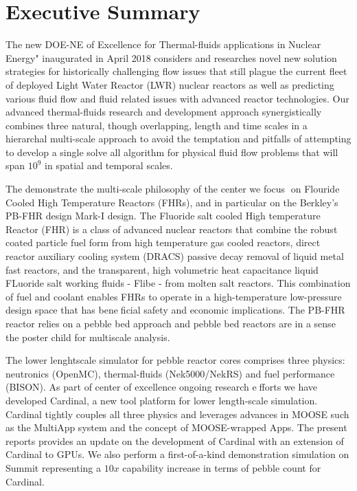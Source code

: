 
\section*{Executive Summary}

The new DOE-NE \Center of Excellence for Thermal-fluids applications in Nuclear Energy" inaugurated in
April 2018 considers and researches novel new solution strategies for historically challenging
flow issues that still plague the current  fleet of deployed Light Water Reactor (LWR) nuclear reactors as well as predicting various fluid flow and  fluid related issues with advanced reactor technologies. Our advanced thermal-fluids research and development approach synergistically combines three natural, though overlapping, length and time scales in a hierarchal multi-scale approach to avoid the temptation and pitfalls of attempting to develop a single solve all algorithm for physical  fluid flow problems that will span $10^9$ in spatial and temporal scales.

The demonstrate the multi-scale philosophy of the center we focus on Flouride Cooled High
Temperature Reactors (FHRs), and in particular on the Berkley's PB-FHR design Mark-I design. The
Fluoride salt cooled High temperature Reactor (FHR) is a class of advanced nuclear reactors that combine the
robust coated particle fuel form from high temperature gas cooled reactors, direct reactor auxiliary cooling
system (DRACS) passive decay removal of liquid metal fast reactors, and the transparent, high volumetric heat capacitance liquid FLuoride salt working fluids - Flibe - from molten salt reactors. This combination of fuel and coolant enables FHRs to operate in a high-temperature low-pressure design space that has beneficial safety and economic implications. The PB-FHR reactor relies on a pebble bed approach and pebble bed reactors are in a sense the poster child for multiscale analysis.

The lower lenghtscale simulator for pebble reactor cores comprises three physics: neutronics (OpenMC),
thermal-fluids (Nek5000/NekRS) and fuel performance (BISON). As part of center of excellence ongoing research efforts we have developed Cardinal, a new tool platform for lower length-scale simulation. Cardinal tightly couples all three physics and leverages advances in MOOSE such as the MultiApp system and the concept of MOOSE-wrapped Apps. The present reports provides an update on the development of Cardinal with an extension of Cardinal to GPUs. We also perform a first-of-a-kind demonstration simulation on Summit representing a $10x$ capability increase in terms of pebble count for Cardinal.
